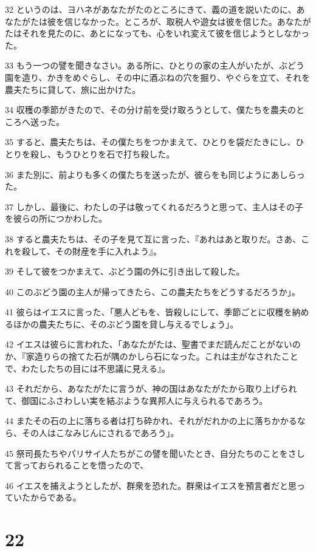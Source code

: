 \par 32 というのは、ヨハネがあなたがたのところにきて、義の道を説いたのに、あなたがたは彼を信じなかった。ところが、取税人や遊女は彼を信じた。あなたがたはそれを見たのに、あとになっても、心をいれ変えて彼を信じようとしなかった。
\par 33 もう一つの譬を聞きなさい。ある所に、ひとりの家の主人がいたが、ぶどう園を造り、かきをめぐらし、その中に酒ぶねの穴を掘り、やぐらを立て、それを農夫たちに貸して、旅に出かけた。
\par 34 収穫の季節がきたので、その分け前を受け取ろうとして、僕たちを農夫のところへ送った。
\par 35 すると、農夫たちは、その僕たちをつかまえて、ひとりを袋だたきにし、ひとりを殺し、もうひとりを石で打ち殺した。
\par 36 また別に、前よりも多くの僕たちを送ったが、彼らをも同じようにあしらった。
\par 37 しかし、最後に、わたしの子は敬ってくれるだろうと思って、主人はその子を彼らの所につかわした。
\par 38 すると農夫たちは、その子を見て互に言った、『あれはあと取りだ。さあ、これを殺して、その財産を手に入れよう』。
\par 39 そして彼をつかまえて、ぶどう園の外に引き出して殺した。
\par 40 このぶどう園の主人が帰ってきたら、この農夫たちをどうするだろうか」。
\par 41 彼らはイエスに言った、「悪人どもを、皆殺しにして、季節ごとに収穫を納めるほかの農夫たちに、そのぶどう園を貸し与えるでしょう」。
\par 42 イエスは彼らに言われた、「あなたがたは、聖書でまだ読んだことがないのか、『家造りらの捨てた石が隅のかしら石になった。これは主がなされたことで、わたしたちの目には不思議に見える』。
\par 43 それだから、あなたがたに言うが、神の国はあなたがたから取り上げられて、御国にふさわしい実を結ぶような異邦人に与えられるであろう。
\par 44 またその石の上に落ちる者は打ち砕かれ、それがだれかの上に落ちかかるなら、その人はこなみじんにされるであろう」。
\par 45 祭司長たちやパリサイ人たちがこの譬を聞いたとき、自分たちのことをさして言っておられることを悟ったので、
\par 46 イエスを捕えようとしたが、群衆を恐れた。群衆はイエスを預言者だと思っていたからである。

\chapter{22}

